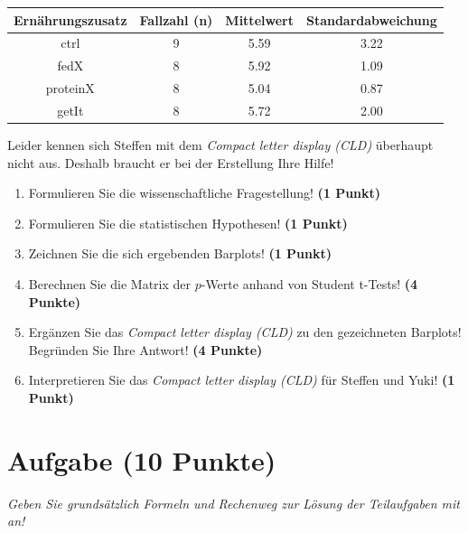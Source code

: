 \documentclass[a4paper, 9pt]{scrartcl}\usepackage[]{graphicx}\usepackage[]{xcolor}
\newenvironment{knitrout}{}{} %
\begin{document}
\begin{knitrout}
\color{fgcolor}\begin{table}[!h]
\centering\begingroup\fontsize{10}{12}\selectfont

\begin{tabular}{cccc}
\toprule
\textbf{Ernährungszusatz} & \textbf{Fallzahl (n)} & \textbf{Mittelwert} & \textbf{Standardabweichung}\\
\midrule
ctrl & 9 & 5.59 & 3.22\\
fedX & 8 & 5.92 & 1.09\\
proteinX & 8 & 5.04 & 0.87\\
getIt & 8 & 5.72 & 2.00\\
\bottomrule
\end{tabular}
\endgroup{}
\end{table}

\end{knitrout}

Leider kennen sich Steffen mit dem \textit{Compact letter display (CLD)} überhaupt nicht aus. Deshalb braucht er bei der Erstellung Ihre Hilfe!

\begin{enumerate}
  \item Formulieren Sie die wissenschaftliche Fragestellung! \textbf{(1 Punkt)}
  \item Formulieren Sie die statistischen Hypothesen! \textbf{(1 Punkt)}
\item Zeichnen Sie die sich ergebenden Barplots! \textbf{(1 Punkt)}
\item Berechnen Sie die Matrix der $p$-Werte anhand von Student t-Tests! \textbf{(4 Punkte)}
\item Ergänzen Sie das \textit{Compact letter display (CLD)} zu den gezeichneten Barplots! Begründen Sie Ihre Antwort! \textbf{(4 Punkte)}
\item Interpretieren Sie das \textit{Compact letter display (CLD)} für Steffen und Yuki! \textbf{(1 Punkt)} 
\end{enumerate}

 
\clearpage

\section{Aufgabe \hfill (10 Punkte)}

\textit{Geben Sie grundsätzlich Formeln und Rechenweg zur Lösung der Teilaufgaben mit an!} \\[1Ex]
 
\end{document}
